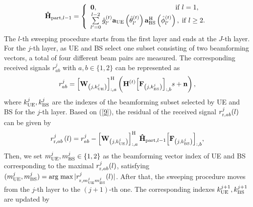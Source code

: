 \documentclass[journal,12pt,onecolumn,draftclsnofoot,]{IEEEtran}
\begin{document}
{\color{black}
\begin{equation}\label{9}
{{\bf{\hat H}}}_{{\rm{part}},l-1} = \left\{ {\begin{array}{*{20}{l}}
{{\bf{0}},\;\;\;\;\;\;\;\;\;\;\;\;\;\;\;\;\;\;\;\;\;\;\;\;\;\;\;\;\;\;\;\;\;\;\;\;\;\;\;\;\;{\rm{if}}\; l=1},\\
{ \mathop \sum \limits_{{l'}= 0}^{l - 2} \hat g_{l'}^{\left(t \right)}{{\bf{a}}_{{\rm{UE}}}}\left({\hat \theta _{l'}^{\left(t \right)}} \right){\bf{a}}_{{\rm{BS}}}^{\rm H}\left({\hat \phi _{l'}^{\left(t \right)}} \right),\;{\rm{if}} \; l\ge2}.
\end{array}} \right. 
\end{equation}
}\noindent The $l$-th sweeping procedure starts from the first layer and ends at the $J$-th layer. 
For the $j$-th layer, as UE and BS select one subset consisting of two beamforming vectors, a total of four different beam pairs are measured.
The corresponding received signals ${{r}}_{ab}^j$ with $a,b\in \{1,2\}$ can be represented as
\begin{equation}
{{r}}_{ab}^j = \left[ {{{\bf{W}}_{\left({j,{k_{{\rm{UE}}}^j}} \right)}}} \right]_{:,a}^{\rm H}\left({{\bf{H}}^{\left(t \right)}{{\left[ {{{\bf{F}}_{\left({j,{k_{{\rm{BS}}}^j}} \right)}}} \right]}_{:,b}}{{s}} + {\bf{n}}} \right),
\end{equation}
\noindent where ${k_{{\rm{UE}}}^j},{k_{{\rm{BS}}}^j}$ are the indexes of the beamforming subset selected by UE and BS for the $j$-th layer. 
Based on (\ref{9}), the residual of the received signal ${{r}}_{{\rm r},ab}^j( l ) $ can be given by
\begin{equation}\label{11}
{{r}}_{{\rm r},ab}^j\left( l \right) = {{r}}_{ab}^j-\left[ {{{\bf{W}}_{\left({j,{k_{{\rm{UE}}}^j}} \right)}}} \right]_{:,a}^{\rm H}
{{\bf{\hat H}}}_{{\rm{part}},l-1}
{{\left[ {{{\bf{F}}_{\left({j,{k_{{\rm{BS}}}^j}} \right)}}} \right]}_{:,b}},
\end{equation}
Then, we set ${m_{{\rm{UE}}}^{j}},{m_{{\rm{BS}}}^{j}}\in \{1,2\}$ as the beamforming vector index of UE and BS corresponding to the maximal ${{r}}_{{\rm r},ab}^j( l ) $, satisfying 
$( {m_{{\rm{UE}}}^j,m_{{\rm{BS}}}^j} ) = \mathop {{\rm{arg\;max}}}| {{r}}_{{\rm r},m_{{\rm{UE}}}^jm_{{\rm{BS}}}^j}^j (l)|$.
After that, the sweeping procedure moves from the $j$-th layer to the $(j+1)$-th one. The corresponding indexes ${k_{{\rm{UE}}}^{j+1}},{k_{{\rm{BS}}}^{j+1}}$ are updated by
\end{document}
